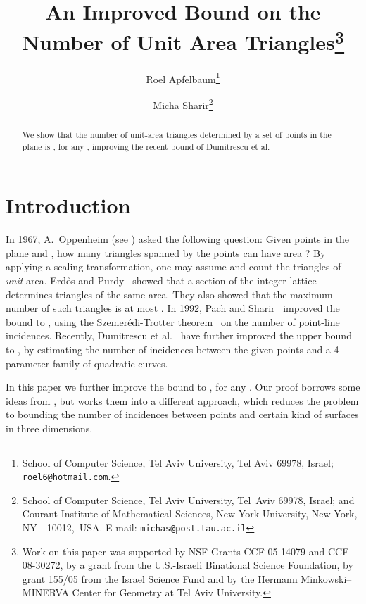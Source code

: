 \documentclass[12pt]{article}
\begin{document}
\title{An Improved Bound on the Number of Unit Area Triangles\thanks{Work on this paper was supported by NSF Grants CCF-05-14079 and
  CCF-08-30272, 
  by a grant from the U.S.-Israeli Binational Science Foundation, 
  by grant 155/05 from the Israel Science Fund and by the
  Hermann Minkowski--MINERVA Center for Geometry at Tel Aviv University.} }
\author{
    Roel Apfelbaum\thanks{School of Computer Science, Tel Aviv University,
    Tel Aviv 69978, Israel;
    \texttt{roel6@hotmail.com}.}
    \and
  Micha Sharir\thanks{School of Computer Science, Tel Aviv University, Tel~Aviv 69978,
    Israel; and Courant Institute of Mathematical Sciences, New York
    University, New York, NY~~10012,~USA. E-mail:
    \texttt{michas@post.tau.ac.il}} }

\maketitle

\begin{abstract}
We show that the number of unit-area triangles determined by a set of
 points in the plane is , for any ,
improving the recent bound  of Dumitrescu et al.
\end{abstract}


\section{Introduction}
\label{sec:intro}

In 1967, A.~Oppenheim (see \cite{EP95}) asked the following question:
Given  points in the plane and , how many triangles spanned
by the points can have area ? By applying a scaling transformation,
one may assume  and count the triangles of {\em unit} area.
Erd\H{o}s and Purdy~\cite{EP71} showed that a  section of the integer lattice determines
 triangles of the same area. They also showed
that the maximum number of such triangles is at most . In
1992, Pach and Sharir~\cite{PS92} improved the bound to
, using the Szemer\'edi-Trotter theorem~\cite{ST83} 
on the number of point-line incidences. Recently,
Dumitrescu et al.~\cite{DST08} have further improved the upper bound 
to , by estimating the number of incidences
between the given points and a 4-parameter family of quadratic curves. 

In this paper we further improve the bound to , for
any . Our proof borrows some ideas from \cite{DST08}, but
works them into a different approach, which reduces the problem to 
bounding the number of incidences between points and certain kind 
of surfaces in three dimensions.
\end{document}
